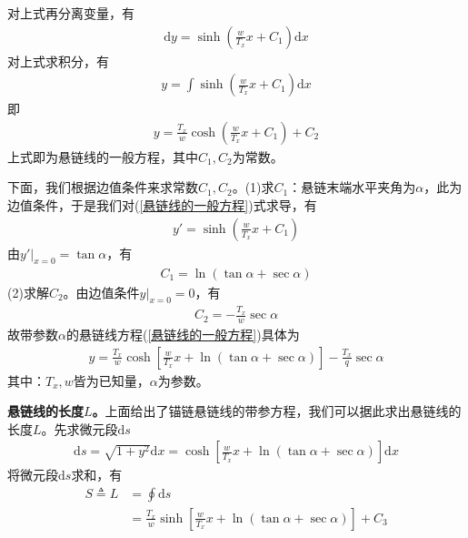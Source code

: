 \documentclass[UTF8]{ctexbook}
\theoremstyle{nonumberplain}
\begin{document}
            对上式再分离变量，有
            \begin{align*}
            \mathrm{d}y = \sinh(\frac{w}{T_x}x+C_1)\mathrm{d}x
            \end{align*}
            对上式求积分，有
            \begin{align*}
            y = \int \sinh(\frac{w}{T_x}x+C_1)\mathrm{d}x
            \end{align*}
            即
            \begin{align}
            \label{悬链线的一般方程}
            y =\frac{T_x}{w}\cosh(\frac{w}{T_x}x+C_1)+C_2
            \end{align}
            上式即为悬链线的一般方程，其中$C_1,C_2$为常数。
            \par
            下面，我们根据边值条件来求常数$C_1,C_2$。(1)求$C_1$：悬链末端水平夹角为$\alpha$，此为边值条件，于是我们对(\ref{悬链线的一般方程})式求导，有
            \begin{align*}
            y' = \sinh(\frac{w}{T_x}x+C_1)
            \end{align*}
            由$y'|_{x=0}=\tan\alpha$，有
            \begin{align*}
            C_1 = \ln (\tan\alpha+\sec\alpha)
            \end{align*}
            (2)求解$C_2$。由边值条件$y|_{x=0}=0$，有
            \begin{align*}
            C_2 = -\frac{T_x}{w}\sec\alpha
            \end{align*}
            故带参数$\alpha$的悬链线方程(\ref{悬链线的一般方程})具体为
            \begin{align*}
            y = \frac{T_x}{w}\cosh\left[\frac{w}{T_x}x+\ln (\tan\alpha+\sec\alpha) \right]-\frac{T_x}{q}\sec\alpha
            \end{align*}
            其中：$T_x,w$皆为已知量，$\alpha$为参数。
            \par
            \textbf{悬链线的长度$L$。}上面给出了锚链悬链线的带参方程，我们可以据此求出悬链线的长度$L$。先求微元段$\mathrm{d}s$
            \begin{align*}
            \mathrm{d}s = \sqrt{1+y^2}\mathrm{d}x = \cosh\left[ \frac{w}{T_x}x+\ln (\tan\alpha+\sec\alpha) \right]\mathrm{d}x
            \end{align*}
            将微元段$\mathrm{d}s$求和，有
            \begin{align*}
            S \triangleq L &= \oint \mathrm{d}s\\
            &=\frac{T_x}{w}\sinh \left[\frac{w}{T_x}x+\ln (\tan\alpha+\sec\alpha)  \right]+C_3
            \end{align*}
\end{document}
